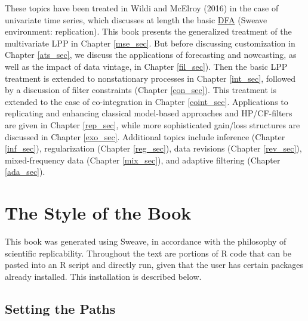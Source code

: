 \documentclass[a4paper]{book}
\begin{document}
These topics have been treated in Wildi and McElroy (2016) in the case of univariate time series, which discusses at length
 the basic \href{http://blog.zhaw.ch/sef/files/2014/10/DFA.pdf}{DFA} (Sweave environment: replication).  This book presents
 the generalized treatment of the multivariate LPP in   Chapter \ref{mse_sec}. But before discussing customization in Chapter \ref{ats_sec},
 we discuss the applications of forecasting and nowcasting, as well as the impact of data vintage, in  Chapter \ref{fil_sec}).
 Then the basic LPP treatment is extended to nonstationary processes in Chapter \ref{int_sec}, followed by a discussion of filter constraints (Chapter \ref{con_sec}).
  This treatment is extended to the case of co-integration in Chapter \ref{coint_sec}.   Applications to replicating and enhancing classical model-based approaches and HP/CF-filters 
 are given in Chapter \ref{rep_sec}, while  more sophisticated gain/loss structures  are discussed in Chapter \ref{exo_sec}.
Additional topics include inference (Chapter \ref{inf_sec}), regularization (Chapter \ref{reg_sec}), data revisions (Chapter \ref{rev_sec}),
 mixed-frequency data (Chapter \ref{mix_sec}), and   adaptive filtering (Chapter \ref{ada_sec}).

\section{The Style of the Book}

This book was generated using Sweave, in accordance with the philosophy of 
 scientific replicability.  Throughout the text are portions of R code that
 can be pasted into an R script and directly run, given that the user
 has certain packages already installed.  This installation is described below.
 
\subsection{Setting the Paths}
\end{document}
